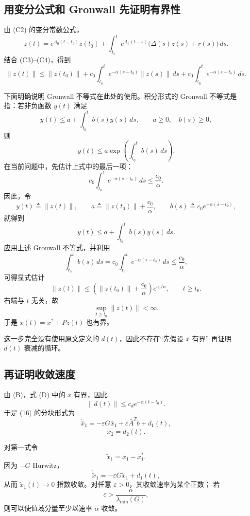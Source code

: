 \documentclass[UTF8,fontset=fandol]{ctexart}
\begin{document}
\subsection{用变分公式和 Gronwall 先证明有界性}

由 (C2) 的变分常数公式，
\[
z(t)
=e^{A_0(t-t_0)}z(t_0)
+\int_{t_0}^{t}e^{A_0(t-s)}
\bigl(\Delta(s)z(s)+r(s)\bigr)\,ds.
\]
结合 (C3)--(C4)，得到
\[
\|z(t)\|
\leq\|z(t_0)\|
+c_0\int_{t_0}^{t}e^{-\alpha(s-t_0)}\|z(s)\|\,ds
+c_0\int_{t_0}^{t}e^{-\alpha(s-t_0)}\,ds.
\]

下面明确说明 Gronwall 不等式在此处的使用。积分形式的 Gronwall
不等式是指：若非负函数 $y(t)$ 满足
\[
y(t)\leq a+\int_{t_0}^{t}b(s)y(s)\,ds,
\qquad a\geq0,\quad b(s)\geq0,
\]
则
\[
y(t)\leq a\exp\left(\int_{t_0}^{t}b(s)\,ds\right).
\]
在当前问题中，先估计上式中的最后一项：
\[
c_0\int_{t_0}^{t}e^{-\alpha(s-t_0)}\,ds
\leq \frac{c_0}{\alpha}.
\]
因此，令
\[
y(t)\triangleq\|z(t)\|,\qquad
a\triangleq\|z(t_0)\|+\frac{c_0}{\alpha},\qquad
b(s)\triangleq c_0e^{-\alpha(s-t_0)},
\]
就得到
\[
y(t)\leq a+\int_{t_0}^{t}b(s)y(s)\,ds.
\]
应用上述 Gronwall 不等式，并利用
\[
\int_{t_0}^{t}b(s)\,ds
=c_0\int_{t_0}^{t}e^{-\alpha(s-t_0)}\,ds
\leq\frac{c_0}{\alpha},
\]
可得显式估计
\begin{equation}
\|z(t)\|
\leq
\left(\|z(t_0)\|+\frac{c_0}{\alpha}\right)
e^{c_0/\alpha},
\qquad t\geq t_0.
\tag{C5}
\end{equation}
右端与 $t$ 无关，故
\begin{equation}
\sup_{t\geq t_0}\|z(t)\|<\infty.
\tag{B}
\end{equation}
于是 $x(t)=x^*+Pz(t)$ 也有界。

这一步完全没有使用原文定义的 $d(t)$，因此不存在“先假设 $\bar{x}$ 有界”
再证明 $d(t)$ 衰减的循环。

\subsection{再证明收敛速度}

由 (B)，式 (D) 中的 $\bar{x}$ 有界，因此
\[
\|d(t)\|\leq c_de^{-\alpha(t-t_0)}.
\]
于是 (16) 的分块形式为
\begin{equation}
\dot{\bar{x}}_1
=-\varepsilon G\bar{x}_1+\varepsilon\bar{A}^{T}b+d_1(t),
\tag{17a}
\end{equation}
\begin{equation}
\dot{\bar{x}}_2=d_2(t).
\tag{17b}
\end{equation}

对第一式令
\[
\tilde{x}_1=\bar{x}_1-\bar{x}_1^*.
\]
因为 $-G$ Hurwitz，
\[
\dot{\tilde{x}}_1=-\varepsilon G\tilde{x}_1+d_1(t),
\]
从而 $\tilde{x}_1(t)\to0$ 指数收敛。对任意 $\varepsilon>0$，其收敛速率为某个正数；
若
\begin{equation}
\varepsilon>
\frac{\alpha}{\lambda_{\min}(G)},
\tag{R}
\end{equation}
则可以使值域分量至少以速率 $\alpha$ 收敛。
\end{document}
